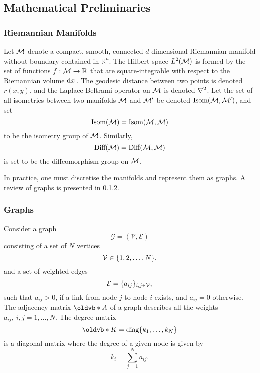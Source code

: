 \subsection{Mathematical Preliminaries}\label{sec:chapter4_mathematical_preliminaries}

\subsubsection{Riemannian Manifolds}

Let \(\mathcal{M}{}\) denote a compact, smooth, connected \(d\)-dimensional Riemannian manifold without boundary contained in \(\mathbb{R}^{n}\).
The Hilbert space \(L^{2}(\mathcal{M})\) is formed by the set of functions \(f : \mathcal{M} \to \mathbb{R}\) that are square-integrable with respect to the Riemannian volume \(\dd{x}{}\).
The geodesic distance between two points is denoted \(r(x,y)\), and the Laplace-Beltrami operator on \(\mathcal{M}{}\) is denoted \(\laplacian{}\).
Let the set of all isometries between two manifolds \(\mathcal{M}{}\) and \(\mathcal{M}'\) be denoted \(\text{Isom}(\mathcal{M},\mathcal{M}')\), and set
%
\begin{equation}
	\text{Isom}(\mathcal{M})
	= \text{Isom}(\mathcal{M},\mathcal{M})
\end{equation}
%
to be the isometry group of \(\mathcal{M}{}\).
Similarly,
%
\begin{equation}
	\text{Diff}(\mathcal{M})
	= \text{Diff}(\mathcal{M},\mathcal{M})
\end{equation}
%
is set to be the diffeomorphism group on \(\mathcal{M}{}\).

In practice, one must discretise the manifolds and represent them as graphs.
A review of graphs is presented in \cref{sec:chapter4_graphs}.

\subsubsection{Graphs}\label{sec:chapter4_graphs}

Consider a graph
%
\begin{equation}
	\mathcal{G}
	= (\mathcal{V}, \mathcal{E})
\end{equation}
%
consisting of a set of \(N\) vertices
%
\begin{equation}
	\mathcal{V}
	\in \{1,2,\ldots,N\},
\end{equation}
%
and a set of weighted edges
%
\begin{equation}
	\mathcal{E}
	= \{a_{i j}\}_{i,j \in \mathcal{V}},
\end{equation}
%
such that \(a_{i j} > 0\), if a link from node \(j\) to node \(i\) exists, and \(a_{i j} = 0\) otherwise.
The adjacency matrix \(\vb{A}\) of a graph describes all the weights \(a_{i j},\ i,j = 1,\ldots,N\).
The degree matrix
%
\begin{equation}
	\vb{K}
	= \diag{k_{1},\ldots,k_{N}}
\end{equation}
%
is a diagonal matrix where the degree of a given node is given by
%
\begin{equation}
	k_{i}
	= \sum\limits_{j=1}^{N} a_{i j}.
\end{equation}

